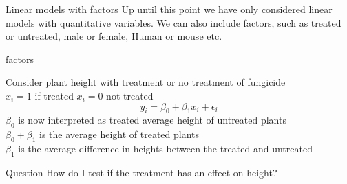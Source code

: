 \documentclass{bredelebeamer}
\begin{document}
\begin{frame}{Linear models with factors}
Up until this point we have only considered linear models with quantitative variables. We can also include factors, such as treated or untreated, male or female, Human or mouse etc.
\begin{exampleblock}{factors}

Consider plant height with treatment or no treatment of fungicide 
\\
 $x_i = 1$ if treated $x_i = 0$ not treated
\begin{equation}
y_i = \beta_0 + \beta_1x_i + \epsilon_i
\end{equation}
 $\beta_0$ is now interpreted as treated average height of untreated plants
 \\
 $\beta_0 + \beta_1$ is the average height of treated plants
 \\
 $\beta_1$ is the average difference in heights between the treated and untreated

\end{exampleblock}

\begin{alertblock}{Question}
How do I test if the treatment has an effect on height?
\end{alertblock}

\end{frame}
\end{document}
